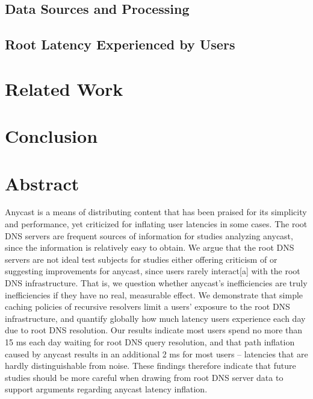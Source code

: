 \documentclass[sigconf,nonacm,10pt]{acmart}
\begin{document}
\subsection{Data Sources and
Processing}\label{data-sources-and-processing}

\subsection{Root Latency Experienced by
Users}\label{root-latency-experienced-by-users}

\section{Related Work}\label{related-work}

\section{Conclusion}\label{conclusion}

\fi

\section*{Abstract}\label{abstract-1}

Anycast is a means of distributing content that has been praised for its
simplicity and performance, yet criticized for inflating user latencies
in some cases. The root DNS servers are frequent sources of information
for studies analyzing anycast, since the information is relatively easy
to obtain. We argue that the root DNS servers are not ideal test
subjects for studies either offering criticism of or suggesting
improvements for anycast, since users rarely interact{[}a{]} with the
root DNS infrastructure. That is, we question whether anycast's
inefficiencies are truly inefficiencies if they have no real, measurable
effect.\break
We demonstrate that simple caching policies of recursive resolvers limit
a users' exposure to the root DNS infrastructure, and quantify globally
how much latency users experience each day due to root DNS resolution.
Our results indicate most users spend no more than 15 ms each day
waiting for root DNS query resolution, and that path inflation caused by
anycast results in an additional 2 ms for most users -- latencies that
are hardly distinguishable from noise. These findings therefore indicate
that future studies should be more careful when drawing from root DNS
server data to support arguments regarding anycast latency inflation.
\end{document}
